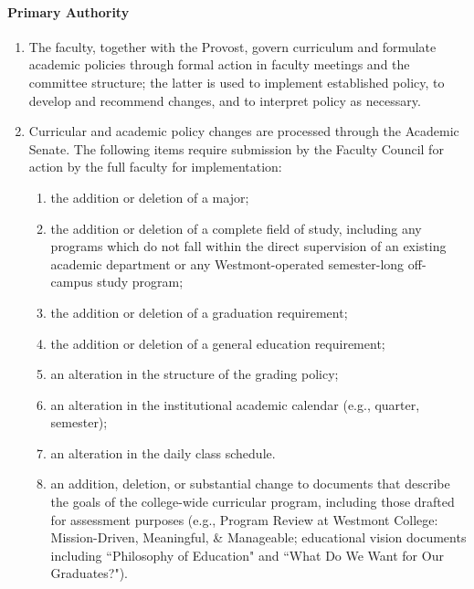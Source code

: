 \documentclass[letterpaper, 11pt]{article}
\begin{document}
			\paragraph{Primary Authority}
				\begin{enumerate}

					\item{ The faculty, together with the Provost, govern curriculum
						and formulate academic policies through formal action in
						faculty meetings and the committee structure; the latter is
						used to implement established policy, to develop and
						recommend changes, and to interpret policy as necessary.}
					\item{ Curricular and academic policy changes are processed
						through the Academic Senate. The following items require
						submission by the Faculty Council for action by the full
						faculty for implementation:
						\begin{enumerate}
							\item{ the addition or deletion of a major;}

							\item{ the addition or deletion of a complete field of study, including any programs which
								do not fall within the direct supervision of an existing academic department or any
								Westmont-operated semester-long off-campus study program;}

							\item{ the addition or deletion of a graduation requirement;}

							\item{ the addition or deletion of a general education requirement;}

							\item{ an alteration in the structure of the grading policy;}

							\item{ an alteration in the institutional academic calendar (e.g., quarter, semester);}

							\item{ an alteration in the daily class schedule.}

							\item{ an addition, deletion, or substantial change to documents that describe the goals of
								the college-wide curricular program, including those drafted for assessment purposes
								(e.g., Program Review at Westmont College: Mission-Driven, Meaningful, \& Manageable;
								educational vision documents including ``Philosophy of Education" and ``What Do We Want
								for Our Graduates?").}

						\end{enumerate}
					}
				\end{enumerate}
\end{document}

